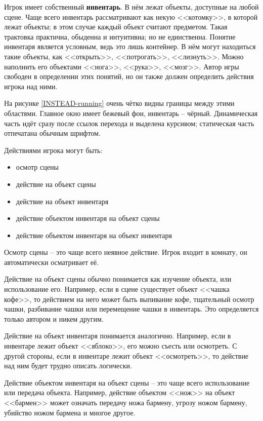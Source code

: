 \documentclass[a4paper,12pt]{article}
\begin{document}
Игрок имеет собственный \textbf{инвентарь}. В нём лежат объекты, доступные на любой сцене. Чаще всего инвентарь рассматривают как некую <<котомку>>, в которой лежат объекты; в этом случае каждый объект считают предметом. Такая трактовка практична, обыденна и интуитивна; но не единственна. Понятие инвентаря является условным, ведь это лишь контейнер. В нём могут находиться такие объекты, как <<открыть>>, <<потрогать>>, <<лизнуть>>. Можно наполнить его объектами <<нога>>, <<рука>>, <<мозг>>. Автор игры свободен в определении этих понятий, но он также должен определить действия игрока над ними.

На рисунке \ref{INSTEAD-running} очень чётко видны границы между этими областями. Главное окно имеет бежевый фон, инвентарь -- чёрный. Динамическая часть идёт сразу после ссылок перехода и выделена курсивом; статическая часть отпечатана обычным шрифтом.

Действиями игрока могут быть:

\begin{itemize}
\item {осмотр сцены}
\item {действие на объект сцены}
\item {действие на объект инвентаря}
\item {действие объектом инвентаря на объект сцены}
\item {действие объектом инвентаря на объект инвентаря}
\end{itemize}

Осмотр сцены -- это чаще всего неявное действие. Игрок входит в комнату, он автоматически осматривает её.

Действие на объект сцены обычно понимается как изучение объекта, или использование его. Например, если в сцене существует объект <<чашка кофе>>, то действием на него может быть выпивание кофе, тщательный осмотр чашки, разбивание чашки или перемещение чашки в инвентарь. Это определяется только автором и никем другим.

Действие на объект инвентаря понимается аналогично. Например, если в инвентаре лежит объект <<яблоко>>, его можно съесть или осмотреть. С другой стороны, если в инвентаре лежит объект <<осмотреть>>, то действие над ним будет трудно описать логически.

Действие объектом инвентаря на объект сцены -- это чаще всего использование или передача объекта. Например, действие объектом <<нож>> на объект <<бармен>> может означать передачу ножа бармену, угрозу ножом бармену, убийство ножом бармена и многое другое.
\end{document}
